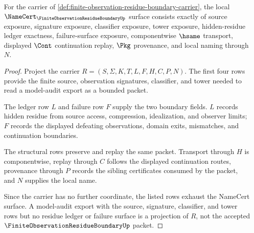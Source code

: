 \begin{theorem}
\label{thm:finite-observation-residue-boundary-namecert-obligations}
For the carrier of \autoref{def:finite-observation-residue-boundary-carrier}, the local $\NameCert_{\FiniteObservationResidueBoundaryUp}$ surface consists exactly of source exposure, signature exposure, classifier exposure, tower exposure, hidden-residue ledger exactness, failure-surface exposure, componentwise $\hsame$ transport, displayed $\Cont$ continuation replay, $\Pkg$ provenance, and local naming through $N$.
\end{theorem}
\begin{proof}
Project the carrier $R=(S,\Sigma,K,T,L,F,H,C,P,N)$. The first four rows provide the finite source, observation signatures, classifier, and tower needed to read a model-audit export as a bounded packet.

The ledger row $L$ and failure row $F$ supply the two boundary fields. $L$ records hidden residue from source access, compression, idealization, and observer limits; $F$ records the displayed defeating observations, domain exits, mismatches, and continuation boundaries.

The structural rows preserve and replay the same packet. Transport through $H$ is componentwise, replay through $C$ follows the displayed continuation routes, provenance through $P$ records the sibling certificates consumed by the packet, and $N$ supplies the local name.

Since the carrier has no further coordinate, the listed rows exhaust the NameCert surface. A model-audit export with the source, signature, classifier, and tower rows but no residue ledger or failure surface is a projection of $R$, not the accepted $\FiniteObservationResidueBoundaryUp$ packet.
\end{proof}

